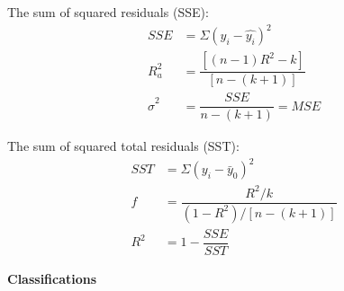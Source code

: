 The sum of squared residuals (SSE):
\begin{align*}
SSE&=\Sigma(y_{i}-\widehat{y_{i}})^2\\
R^{2}_{a}&=\dfrac{[(n-1)R^{2}-k]}{[n-(k+1)]}\\
\hat{\sigma}^2 &=\dfrac{SSE}{n-(k+1)}=MSE
\end{align*}

The sum of squared total residuals (SST):
\begin{align*}
SST&=\Sigma(y_{i}-\bar{y}_{0})^{2} \\
f&=\dfrac{R^2/k}{(1-R^{2})/[n-(k+1)]} \\R^2 &= 1-\dfrac{SSE}{SST}
\end{align*}


\textbf{\normalsize{Classifications}}\\

